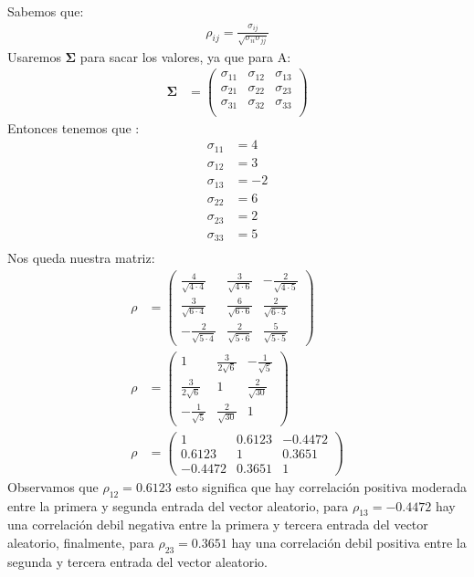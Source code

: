 \begin{sol}
Sabemos que:
\begin{align*}
\rho_{ij} = \frac{\sigma_{ij}}{\sqrt{\sigma_{ii}\sigma_{jj}}}
\end{align*}
Usaremos $\mathbf{\Sigma}$ para sacar los valores, ya que para A:
\begin{align*}
\mathbf{\Sigma} &= 
\begin{pmatrix}
\sigma_{11} & \sigma_{12} & \sigma_{13} \\ 
\sigma_{21} & \sigma_{22} & \sigma_{23} \\ 
\sigma_{31} & \sigma_{32} & \sigma_{33} \\ 
\end{pmatrix}
\end{align*}
Entonces tenemos que :
\begin{align*}
\sigma_{11} &= 4\\
\sigma_{12} &= 3\\
\sigma_{13} &= -2\\
\sigma_{22} &= 6\\
\sigma_{23} &= 2\\
\sigma_{33} &= 5\\
\end{align*}
Nos queda nuestra matriz:
\begin{align*}
\rho &= \begin{pmatrix}
\frac{4}{\sqrt{4\cdot 4}} & \frac{3}{\sqrt{4 \cdot 6}} & -\frac{2}{\sqrt{4 \cdot 5}} \\
\frac{3}{\sqrt{6 \cdot 4}} & \frac{6}{\sqrt{6\cdot 6}} & \frac{2}{\sqrt{6 \cdot 5}} \\
-\frac{2}{\sqrt{5 \cdot 4}} & \frac{2}{\sqrt{5 \cdot 6}} & \frac{5}{\sqrt{5\cdot 5}}
\end{pmatrix}\\
\rho &= \begin{pmatrix}
1 & \frac{3}{2\sqrt{6}} & -\frac{1}{\sqrt{5}} \\
\frac{3}{2\sqrt{6}} & 1 & \frac{2}{\sqrt{30}} \\
-\frac{1}{\sqrt{5}} & \frac{2}{\sqrt{30}} & 1
\end{pmatrix}\\
\rho &= 
\begin{pmatrix}
1 & 0.6123 & -0.4472 \\
0.6123 & 1 & 0.3651 \\
-0.4472 &  0.3651 & 1
\end{pmatrix}
\end{align*}
Observamos que $\rho_{12} = 0.6123$ esto significa que hay correlación positiva moderada entre la primera y segunda entrada del vector aleatorio, para $\rho_{13} = -0.4472$ hay una correlación debil negativa entre la primera y tercera entrada del vector aleatorio, finalmente, para $\rho_{23} = 0.3651$ hay una correlación debil positiva entre la segunda y tercera entrada del vector aleatorio.\\\\

\end{sol}
